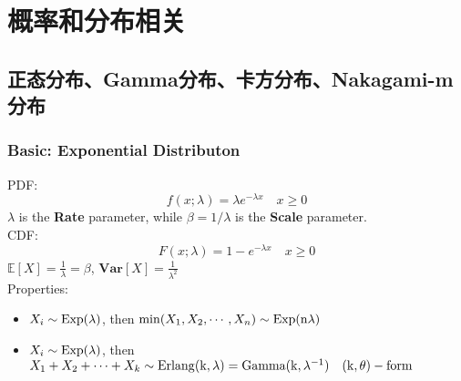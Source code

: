 \documentclass[fontset=none,oneside]{book}
\begin{document}
\chapter{概率和分布相关}
\section{正态分布、Gamma分布、卡方分布、Nakagami-m分布}
\subsection{Basic: Exponential Distributon}
\noindent PDF:
\begin{equation}
\label{eq:35}
f(x;\lambda)=\lambda e^{-\lambda x} \quad x\geq 0
\end{equation}
$\lambda$ is the \textbf{Rate} parameter, while $\beta=1/\lambda$ is the
\textbf{Scale} parameter. \\
CDF:
\begin{equation}
\label{eq:36}
F(x;\lambda)=1-e^{-\lambda x} \quad x\geq 0
\end{equation}
$\mathbb{E}[X]=\frac{1}{\lambda}=\beta$,
$\textbf{Var}[X]=\frac{1}{\lambda^{2}}$ \\
Properties:\\
\begin{itemize}
\item $X_{i}\sim \rm{Exp}(\lambda)$, then
  $\min(X_{1},X_{2},\cdots,X_{n})\sim\rm{Exp}(n\lambda)$
\item $X_{i}\sim \rm{Exp}(\lambda)$, then
  $X_{1}+X_{2}+\cdots+X_{k}\sim\rm{Erlang}(k,\lambda)=Gamma(k,\lambda^{-1})\quad
  (k,\theta)-form$
\end{itemize}
\end{document}
